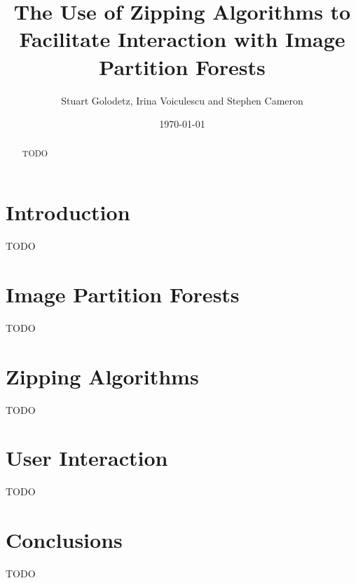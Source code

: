 \documentclass[a4paper]{article}
\begin{document}
\title{The Use of Zipping Algorithms to Facilitate Interaction with Image Partition Forests}
\author{Stuart Golodetz, Irina Voiculescu and Stephen Cameron}
\date{\today}
\maketitle

\begin{abstract}
\noindent TODO
\end{abstract}

\section{Introduction}

TODO \cite{gvccimi08,gvcispa09}

\section{Image Partition Forests}

TODO

\section{Zipping Algorithms}

TODO

\section{User Interaction}

TODO

\section{Conclusions}

TODO



\end{document}
